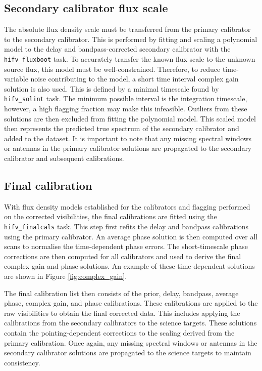 \subsection{Secondary calibrator flux scale}
The absolute flux density scale must be transferred from the primary calibrator to the secondary calibrator. This is performed by fitting and scaling a polynomial model to the delay and bandpass-corrected secondary calibrator with the \texttt{hifv\_fluxboot} task. To accurately transfer the known flux scale to the unknown source flux, this model must be well-constrained. Therefore, to reduce time-variable noise contributing to the model, a short time interval complex gain solution is also used. This is defined by a minimal timescale found by \texttt{hifv\_solint} task. The minimum possible interval is the integration timescale, however, a high flagging fraction may make this infeasible. Outliers from these solutions are then excluded from fitting the polynomial model. This scaled model then represents the predicted true spectrum of the secondary calibrator and added to the dataset. It is important to note that any missing spectral windows or antennas in the primary calibrator solutions are propagated to the secondary calibrator and subsequent calibrations. 

\subsection{Final calibration}
With flux density models established for the calibrators and flagging performed on the corrected visibilities, the final calibrations are fitted using the \texttt{hifv\_finalcals} task. This step first refits the delay and bandpass calibrations using the primary calibrator. An average phase solution is then computed over all scans to normalise the time-dependent phase errors. The short-timescale phase corrections are then computed for all calibrators and used to derive the final complex gain and phase solutions. An example of these time-dependent solutions are shown in Figure \ref{fig:complex_gain}. 

The final calibration list then consists of the prior, delay, bandpass, average phase, complex gain, and phase calibrations. These calibrations are applied to the raw visibilities to obtain the final corrected data. This includes applying the calibrations from the secondary calibrators to the science targets. These solutions contain the pointing-dependent corrections to the scaling derived from the primary calibration. Once again, any missing spectral windows or antennas in the secondary calibrator solutions are propagated to the science targets to maintain consistency. 

